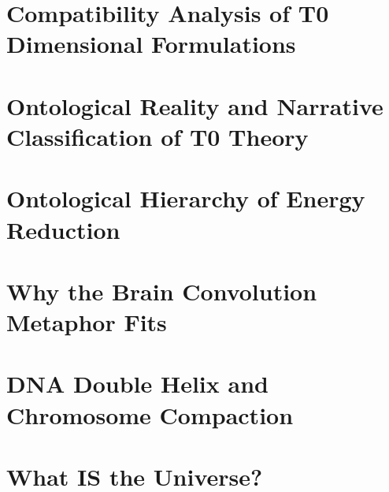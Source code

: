 	\chapter{Compatibility Analysis of T0 Dimensional Formulations}
	
	\chapter{Ontological Reality and Narrative Classification of T0 Theory}
	
	\chapter{Ontological Hierarchy of Energy Reduction}
	
	\chapter{Why the Brain Convolution Metaphor Fits}
	
	\chapter{DNA Double Helix and Chromosome Compaction}
	
	\chapter{What IS the Universe?}
	
	
